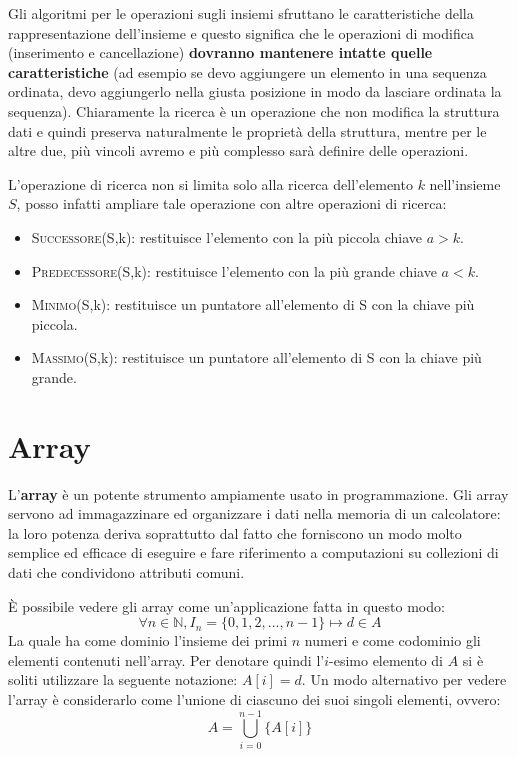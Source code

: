 Gli algoritmi per le operazioni sugli insiemi sfruttano le caratteristiche della rappresentazione dell’insieme e questo significa che le operazioni di modifica (inserimento e cancellazione) \textbf{dovranno mantenere intatte quelle caratteristiche} (ad esempio se devo aggiungere un elemento in una sequenza ordinata, devo aggiungerlo nella giusta posizione in modo da lasciare ordinata la sequenza). Chiaramente la ricerca è un operazione che non modifica la struttura dati e quindi preserva naturalmente le proprietà della struttura, mentre per le altre due, più vincoli avremo e più complesso sarà definire delle operazioni.

L'operazione di ricerca non si limita solo alla ricerca dell'elemento $k$ nell'insieme $S$, posso infatti ampliare tale operazione con altre operazioni di ricerca:
\begin{itemize}
	\item \textsc{Successore}(S,k): restituisce l'elemento con la più piccola chiave $a > k$.
	\item \textsc{Predecessore}(S,k): restituisce l'elemento con la più grande chiave $a < k$.
	\item \textsc{Minimo}(S,k): restituisce un puntatore all'elemento di S con la chiave più piccola.
	\item \textsc{Massimo}(S,k): restituisce un puntatore all'elemento di S con la chiave più grande.
\end{itemize}

\section{Array}
L'\textbf{array} è un potente strumento ampiamente usato in programmazione. Gli array servono ad immagazzinare ed organizzare i dati nella memoria di un calcolatore: la loro potenza deriva soprattutto dal fatto che forniscono un modo molto semplice ed efficace di eseguire e fare riferimento a computazioni su collezioni di dati che condividono attributi comuni.


È possibile vedere gli array come un'applicazione fatta in questo modo:
\begin{equation}
\forall n \in \mathbb{N}, I_{n} = \{0,1,2,...,n-1\} \mapsto d \in A
\end{equation}
La quale ha come dominio l'insieme dei primi $n$ numeri e come codominio gli elementi contenuti nell'array. Per denotare quindi l'$i$-esimo elemento di $A$ si è soliti utilizzare la seguente notazione: $A[i] = d$.
Un modo alternativo per vedere l'array è considerarlo come l'unione di ciascuno dei suoi singoli elementi, ovvero:
\begin{equation}
A = \bigcup_{i=0}^{n-1} \{A[i]\}
\end{equation}

